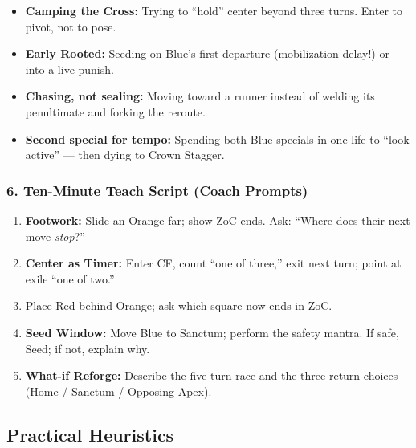 \documentclass[11pt]{article}
\begin{document}
\begin{rulevariant}[title={Common New-Player Pitfalls (Spot \& Stop)}]
\begin{itemize}\itemsep0.2em
  \item \textbf{Camping the Cross:} Trying to “hold” center beyond three turns. Enter to pivot, not to pose.
  \item \textbf{Early Rooted:} Seeding on Blue’s first departure (mobilization delay!) or into a live punish.
  \item \textbf{Chasing, not sealing:} Moving toward a runner instead of welding its penultimate and forking the reroute.
  \item \textbf{Second special for tempo:} Spending both Blue specials in one life to “look active” — then dying to Crown Stagger.
\end{itemize}
\end{rulevariant}

\subsubsection*{6. Ten-Minute Teach Script (Coach Prompts)}
\begin{enumerate}\itemsep0.25em
  \item \textbf{Footwork:} Slide an Orange far; show ZoC ends. Ask: “Where does their next move \emph{stop}?”
  \item \textbf{Center as Timer:} Enter CF, count “one of three,” exit next turn; point at exile “one of two.”
  \item {} Place Red behind Orange; ask which square now ends in ZoC.
  \item \textbf{Seed Window:} Move Blue to Sanctum; perform the safety mantra. If safe, Seed; if not, explain why.
  \item \textbf{What-if Reforge:} Describe the five-turn race and the three return choices (Home / Sanctum / Opposing Apex).
\end{enumerate}

\subsection*{Practical Heuristics}
\end{document}
